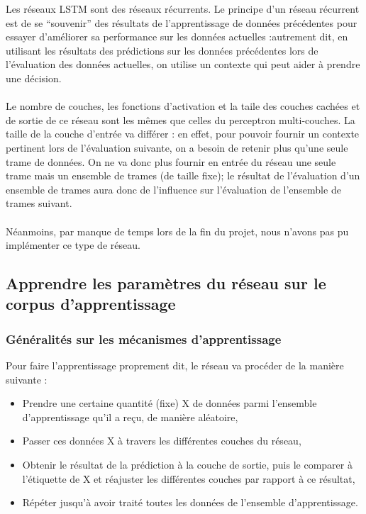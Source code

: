\documentclass{article}
\begin{document}
Les réseaux LSTM sont des réseaux récurrents. Le principe d'un réseau récurrent est de se ``souvenir'' des résultats de l'apprentissage de données précédentes pour essayer d'améliorer sa performance sur les données actuelles :autrement dit, en utilisant les résultats des prédictions sur les données précédentes lors de l'évaluation des données actuelles, on utilise un contexte qui peut aider à prendre une décision.\\
 \\
Le nombre de couches, les fonctions d'activation et la taile des couches cachées et de sortie de ce réseau sont les mêmes que celles du perceptron multi-couches. La taille de la couche d'entrée va différer : en effet, pour pouvoir fournir un contexte pertinent lors de l'évaluation suivante, on a besoin de retenir plus qu'une seule trame de données. On ne va donc plus fournir en entrée du réseau une seule trame mais un ensemble de trames (de taille fixe); le résultat de l'évaluation d'un ensemble de trames aura donc de l'influence sur l'évaluation de l'ensemble de trames suivant.\\
 \\
Néanmoins, par manque de temps lors de la fin du projet, nous n'avons pas pu implémenter ce type de réseau.

\subsection{Apprendre les paramètres du réseau sur le corpus d'apprentissage}

\subsubsection{Généralités sur les mécanismes d'apprentissage}

Pour faire l'apprentissage proprement dit, le réseau va procéder de la manière suivante :
\begin{itemize}
  \item Prendre une certaine quantité (fixe) X de données parmi l'ensemble d'apprentissage qu'il a reçu, de manière aléatoire,
  \item Passer ces données X à travers les différentes couches du réseau,
  \item Obtenir le résultat de la prédiction à la couche de sortie, puis le comparer à l'étiquette de X et réajuster les différentes couches par rapport à ce résultat,
  \item Répéter jusqu'à avoir traité toutes les données de l'ensemble d'apprentissage.
\end{itemize}
\end{document}
